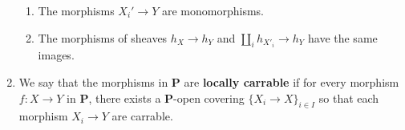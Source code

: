 \documentclass{tufte-book} %
\numberwithin{dummy}{section}
\newcommand{\lrta}{\longrightarrow}
\newcommand{\bfp}{\mathbf{P}}
\begin{document}
\begin{enumerate}
\begin{enumerate}[label=(\alph*)]
\item The morphisms $X_i'\lrta Y$ are monomorphisms.
\item The morphisms of sheaves $h_X\lrta h_Y$ and $\coprod_i h_{X'_i}\lrta h_Y$ have the same images.
  \end{enumerate}
\item We say that the morphisms in $\bfp$ are \textbf{locally carrable} if for every morphism $f:X\lrta Y$ in $\bfp$, there exists a $\bfp$-open covering $\{X_i\lrta X\}_{i\in I}$ so that each morphism $X_i\lrta Y$ are carrable.
\end{enumerate}
\end{document}
